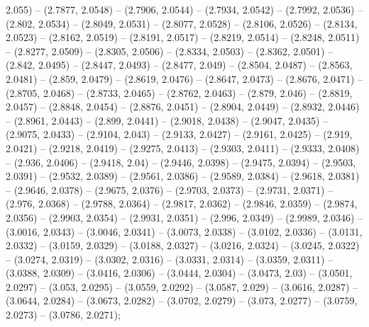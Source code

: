 2.055) -- (2.7877, 2.0548) -- (2.7906, 2.0544) -- (2.7934, 2.0542) -- (2.7992, 2.0536) -- (2.802, 2.0534) -- (2.8049, 2.0531) -- (2.8077, 2.0528) -- (2.8106, 2.0526) -- (2.8134, 2.0523) -- (2.8162, 2.0519) -- (2.8191, 2.0517) -- (2.8219, 2.0514) -- (2.8248, 2.0511) -- (2.8277, 2.0509) -- (2.8305, 2.0506) -- (2.8334, 2.0503) -- (2.8362, 2.0501) -- (2.842, 2.0495) -- (2.8447, 2.0493) -- (2.8477, 2.049) -- (2.8504, 2.0487) -- (2.8563, 2.0481) -- (2.859, 2.0479) -- (2.8619, 2.0476) -- (2.8647, 2.0473) -- (2.8676, 2.0471) -- (2.8705, 2.0468) -- (2.8733, 2.0465) -- (2.8762, 2.0463) -- (2.879, 2.046) -- (2.8819, 2.0457) -- (2.8848, 2.0454) -- (2.8876, 2.0451) -- (2.8904, 2.0449) -- (2.8932, 2.0446) -- (2.8961, 2.0443) -- (2.899, 2.0441) -- (2.9018, 2.0438) -- (2.9047, 2.0435) -- (2.9075, 2.0433) -- (2.9104, 2.043) -- (2.9133, 2.0427) -- (2.9161, 2.0425) -- (2.919, 2.0421) -- (2.9218, 2.0419) -- (2.9275, 2.0413) -- (2.9303, 2.0411) -- (2.9333, 2.0408) -- (2.936, 2.0406) -- (2.9418, 2.04) -- (2.9446, 2.0398) -- (2.9475, 2.0394) -- (2.9503, 2.0391) -- (2.9532, 2.0389) -- (2.9561, 2.0386) -- (2.9589, 2.0384) -- (2.9618, 2.0381) -- (2.9646, 2.0378) -- (2.9675, 2.0376) -- (2.9703, 2.0373) -- (2.9731, 2.0371) -- (2.976, 2.0368) -- (2.9788, 2.0364) -- (2.9817, 2.0362) -- (2.9846, 2.0359) -- (2.9874, 2.0356) -- (2.9903, 2.0354) -- (2.9931, 2.0351) -- (2.996, 2.0349) -- (2.9989, 2.0346) -- (3.0016, 2.0343) -- (3.0046, 2.0341) -- (3.0073, 2.0338) -- (3.0102, 2.0336) -- (3.0131, 2.0332) -- (3.0159, 2.0329) -- (3.0188, 2.0327) -- (3.0216, 2.0324) -- (3.0245, 2.0322) -- (3.0274, 2.0319) -- (3.0302, 2.0316) -- (3.0331, 2.0314) -- (3.0359, 2.0311) -- (3.0388, 2.0309) -- (3.0416, 2.0306) -- (3.0444, 2.0304) -- (3.0473, 2.03) -- (3.0501, 2.0297) -- (3.053, 2.0295) -- (3.0559, 2.0292) -- (3.0587, 2.029) -- (3.0616, 2.0287) -- (3.0644, 2.0284) -- (3.0673, 2.0282) -- (3.0702, 2.0279) -- (3.073, 2.0277) -- (3.0759, 2.0273) -- (3.0786, 2.0271);



